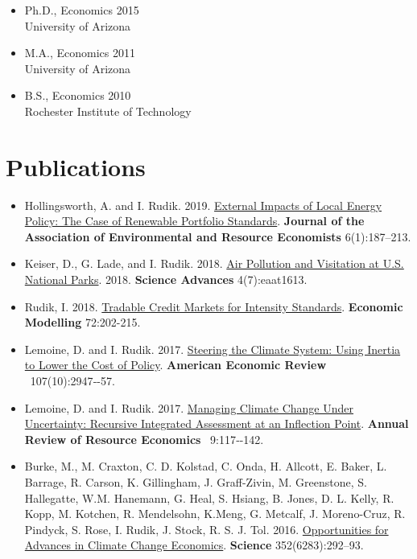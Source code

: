 \documentclass{res} %
\begin{document}
\begin{resume}

	\begin{itemize}
		\item[] Ph.D., Economics \hfill 2015\\
		University of Arizona

		\item[] M.A., Economics \hfill 2011\\
		University of Arizona

		\item[] B.S.,  Economics \hfill 2010\\
		Rochester Institute of Technology

	\end{itemize}
\vspace{-.075in}
\section{Publications}
\begin{itemize}
	\item[] Hollingsworth, A. and I. Rudik. 2019. \href{http://papers.ssrn.com/sol3/papers.cfm?abstract_id=2697222}{External Impacts of Local Energy Policy: The Case of Renewable Portfolio Standards}. \textbf{Journal of the Association of Environmental and Resource Economists} 6(1):187--213.
	\item[] Keiser, D., G. Lade, and I. Rudik. 2018. \href{http://advances.sciencemag.org/content/4/7/eaat1613}{Air Pollution and Visitation at U.S. National Parks}. 2018. \textbf{Science Advances} 4(7):eaat1613.
	\item[] Rudik, I. 2018. \href{https://www.sciencedirect.com/science/article/pii/S0264999317315651}{Tradable Credit Markets for Intensity Standards}. \textbf{Economic Modelling} 72:202-215.
	\item[] Lemoine, D. and I. Rudik. 2017.  \href{http://papers.ssrn.com/sol3/papers.cfm?abstract_id=2443594}{Steering the Climate System: Using Inertia to Lower the Cost of Policy}. \textbf{American Economic Review}  107(10):2947‐-57.
	\item[] Lemoine, D. and I. Rudik. 2017. \href{https://papers.ssrn.com/sol3/papers.cfm?abstract_id=2862211}{Managing Climate Change Under Uncertainty: Recursive Integrated Assessment at an Inflection Point}.  \textbf{Annual Review of Resource Economics}  9:117‐-142.
	\item[]  Burke, M., M. Craxton, C. D. Kolstad, C. Onda, H. Allcott, E. Baker, L. Barrage, R. Carson, K. Gillingham, J. Graff-Zivin, M. Greenstone, S. Hallegatte, W.M. Hanemann, G. Heal, S. Hsiang, B. Jones, D. L. Kelly, R. Kopp, M. Kotchen, R. Mendelsohn, K.Meng, G. Metcalf, J. Moreno-Cruz, R. Pindyck, S. Rose, I. Rudik, J. Stock, R. S. J. Tol. 2016. \href{http://science.sciencemag.org/content/352/6283/292.abstract}{Opportunities for Advances in Climate Change Economics}. \textbf{Science} 352(6283):292--93.
\end{itemize}
\vspace{-.075in}


\end{resume}
\end{document}
